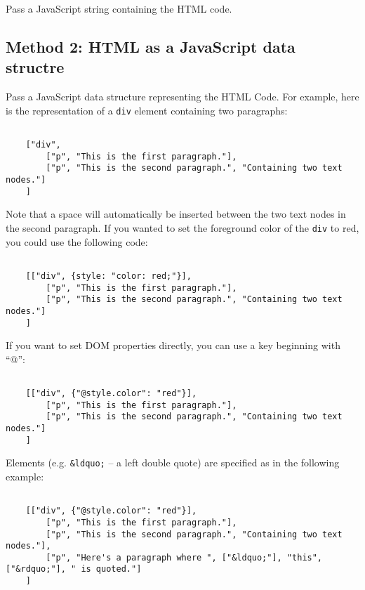 \documentclass[11pt,letterpaper]{article}
\begin{document}
Pass a JavaScript string containing the HTML code.

\subsection{Method 2: HTML as a JavaScript data structre}

Pass a
JavaScript data structure representing the HTML Code. For example, here is
the representation of a \texttt{div} element containing two paragraphs:
\footnotesize\begin{verbatim}

    ["div",
        ["p", "This is the first paragraph."],
        ["p", "This is the second paragraph.", "Containing two text nodes."]
    ]
\end{verbatim}

\smallskip\noindent\normalsize

Note that a space will automatically be inserted between the two text nodes in
the second paragraph. If you wanted to set the foreground color of the \texttt{div} to
red, you could use the following code:
\footnotesize\begin{verbatim}

    [["div", {style: "color: red;"}],
        ["p", "This is the first paragraph."],
        ["p", "This is the second paragraph.", "Containing two text nodes."]
    ]
\end{verbatim}

\smallskip\noindent\normalsize

If you want to set DOM properties directly, you can use
a key beginning with ``@'':
\footnotesize\begin{verbatim}

    [["div", {"@style.color": "red"}],
        ["p", "This is the first paragraph."],
        ["p", "This is the second paragraph.", "Containing two text nodes."]
    ]
\end{verbatim}

\smallskip\noindent\normalsize

Elements (e.g. \texttt{\&ldquo;} -- a left double quote) are specified as in the
following example:
\footnotesize\begin{verbatim}

    [["div", {"@style.color": "red"}],
        ["p", "This is the first paragraph."],
        ["p", "This is the second paragraph.", "Containing two text nodes."],
        ["p", "Here's a paragraph where ", ["&ldquo;"], "this", ["&rdquo;"], " is quoted."]
    ]
\end{verbatim}
\end{document}

